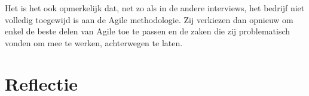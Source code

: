 \documentclass{hogent-article}
\begin{document}
Het is het ook opmerkelijk dat, net zo als in de andere interviews, het bedrijf niet volledig toegewijd is aan de Agile methodologie. Zij verkiezen dan opnieuw om enkel de beste delen van Agile toe te passen en de zaken die zij problematisch vonden om mee te werken, achterwegen te laten. 


\section{Reflectie}


\printbibliography[heading=bibintoc]
\end{document}
